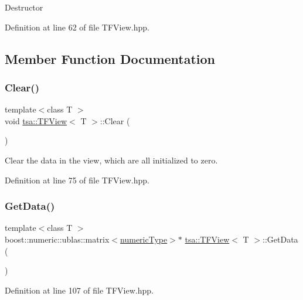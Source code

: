 Destructor 

Definition at line 62 of file T\+F\+View.\+hpp.



\subsection{Member Function Documentation}
\mbox{\label{classtsa_1_1_t_f_view_a5c152e1753388d15dae7215ec9951595}} 
\subsubsection{\texorpdfstring{Clear()}{Clear()}}
{\footnotesize\ttfamily template$<$class T $>$ \\
void \hyperlink{classtsa_1_1_t_f_view}{tsa\+::\+T\+F\+View}$<$ T $>$\+::Clear (\begin{DoxyParamCaption}{ }\end{DoxyParamCaption})\hspace{0.3cm}{\ttfamily [inline]}}

Clear the data in the view, which are all initialized to zero. 

Definition at line 75 of file T\+F\+View.\+hpp.

\mbox{\label{classtsa_1_1_t_f_view_a4dbb5d10597478b8440429e1a9842eab}} 
\subsubsection{\texorpdfstring{Get\+Data()}{GetData()}}
{\footnotesize\ttfamily template$<$class T $>$ \\
boost\+::numeric\+::ublas\+::matrix$<$\hyperlink{classtsa_1_1_t_f_view_a9dcd740f5d29edefd0a181917a9c700b}{numeric\+Type}$>$$\ast$ \hyperlink{classtsa_1_1_t_f_view}{tsa\+::\+T\+F\+View}$<$ T $>$\+::Get\+Data (\begin{DoxyParamCaption}{ }\end{DoxyParamCaption})\hspace{0.3cm}{\ttfamily [inline]}}



Definition at line 107 of file T\+F\+View.\+hpp.

